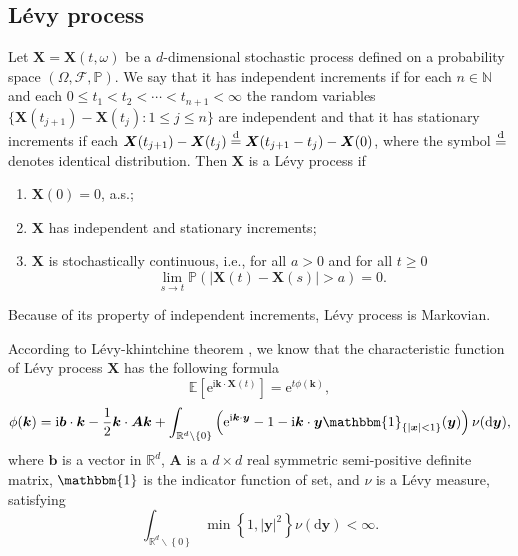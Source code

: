 \documentclass[aps, pre, preprint, amsmath, amssymb]{revtex4}
\newcommand{\e}{\mathrm{e}}
\newcommand{\I}{\mathrm{i}}
\newcommand{\R}{\mathbb{R}}
\newcommand{\N}{\mathbb{N}}
\newcommand{\E}{\mathbb{E}}
\renewcommand{\d}{\mathrm{d}}
\renewcommand{\P}{\mathbb{P}}
\newcommand{\xiaokuo}[1]{\left(#1\right)}
\newcommand{\zhongkuo}[1]{\left[#1\right]}
\newcommand{\dakuo}[1]{\left\{#1\right\}}
\begin{document}
\subsection{L\'{e}vy process}
Let $\bm{X}=\bm{X}(t, \omega)$ be a $d$-dimensional  stochastic process defined on a probability space $(\Omega, \mathscr{F}, \P)$.
We say that it has independent increments if for each $n\in \N$ and each $0\leqslant t_1 < t_2 < \cdots < t_{n+1} < \infty$ the random variables $\{\bm{X}(t_{j+1})-\bm{X}(t_j):1\leqslant j \leqslant n\}$ are independent and that it has stationary increments if each $\bm{X}(t_{j+1})-\bm{X}(t_j)\overset{\textnormal{d}}{=}\bm{X}(t_{j+1}-t_j)-\bm{X}(0)$, where the symbol $\overset{\textnormal{d}}{=}$ denotes identical distribution. 
Then $\bm{X}$ is a L\'{e}vy process \cite{ken1999levy, applebaum2009levy} if
\begin{enumerate}
	\item $\bm{X}(0)=0$, a.s.;
	\item $\bm{X}$ has independent and stationary increments;
	\item $\bm{X}$ is stochastically continuous, i.e., for all $a>0$ and  for all $t\geqslant 0$ 
	\begin{equation*}
		\lim_{s\to t}\P\xiaokuo{\left|\bm{X}(t)-\bm{X}(s)\right|>a}=0.
	\end{equation*}
\end{enumerate}
Because of its property of independent increments, L\'{e}vy process is Markovian.

According to L\'{e}vy-khintchine theorem \cite{mainardi2008origin, ken1999levy, applebaum2009levy}, we know that the characteristic function of L\'{e}vy process $\bm{X}$ has the following formula
\begin{equation}
\E\zhongkuo{\e^{\I \bm{k}\cdot\bm{X}(t)}}=\e^{t\phi(\bm{k})},
\end{equation}
\begin{equation}
\phi(\bm{k})=\I\bm{b}\cdot\bm{k}-\frac{1}{2}\bm{k}\cdot\bm{Ak}+\int_{\R^d\backslash\dakuo{0}}\xiaokuo{\e^{\I\bm{k}\cdot\bm{y}}-1-\I\bm{k}\cdot\bm{y}\mathbbm{1}_{\dakuo{|\bm{x}|<1}}(\bm{y})}\nu(\d\bm{y}),
\end{equation}
where $\bm{b}$ is a vector in $\R^d$, $\bm{A}$ is a $d\times d$ real symmetric semi-positive definite matrix, $\mathbbm{1}$ is the indicator function of  set, and $\nu$ is a L\'{e}vy measure, satisfying 
\begin{equation}
	\int_{\R^d\backslash\dakuo{0}}\min{\dakuo{1, |\bm{y}|^2}}\nu(\d\bm{y})<\infty.
\end{equation}
\end{document}
